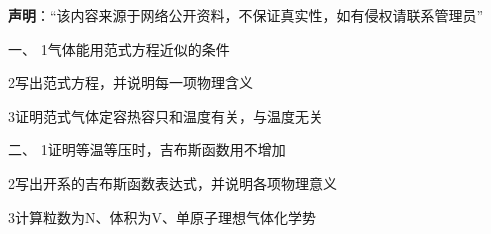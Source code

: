 
\textbf{声明}：“该内容来源于网络公开资料，不保证真实性，如有侵权请联系管理员”



一、
{1}气体能用范式方程近似的条件

{2}写出范式方程，并说明每一项物理含义

{3}证明范式气体定容热容只和温度有关，与温度无关


二、
{1}证明等温等压时，吉布斯函数用不增加

{2}写出开系的吉布斯函数表达式，并说明各项物理意义

{3}计算粒数为N、体积为V、单原子理想气体化学势